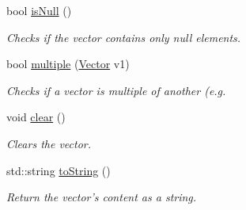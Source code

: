 \begin{CompactItemize}
bool \hyperlink{classgrassmann_1_1Vector_233859ed21cd1cbba69d240de0cf2ba3}{isNull} ()
\begin{CompactList}\small\item\em Checks if the vector contains only null elements. \item\end{CompactList}\item 
bool \hyperlink{classgrassmann_1_1Vector_96dd7bb0a8a2620e34b8a3ac1342deff}{multiple} (\hyperlink{classgrassmann_1_1Vector}{Vector} v1)
\begin{CompactList}\small\item\em Checks if a vector is multiple of another (e.g. \item\end{CompactList}\item 
void \hyperlink{classgrassmann_1_1Vector_c43808ba1c06b8e502b6a4430c674bd4}{clear} ()
\begin{CompactList}\small\item\em Clears the vector. \item\end{CompactList}\item 
std::string \hyperlink{classgrassmann_1_1Vector_2101413da90bea7fd2c911342b48cb60}{toString} ()
\begin{CompactList}\small\item\em Return the vector's content as a string. \item\end{CompactList}\end{CompactItemize}
